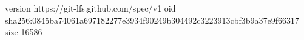 version https://git-lfs.github.com/spec/v1
oid sha256:0845ba74061a697182277e3934f90249b304492c3223913cbf3b9a37e9f66317
size 16586
